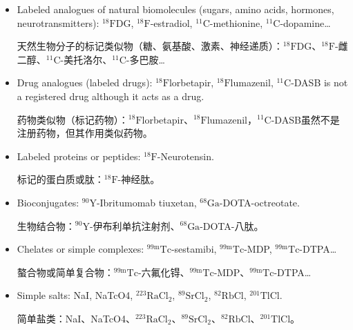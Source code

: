 \documentclass[dvipsnames, svgnames,a4paper,11pt]{article}
\begin{document}
\begin{itemize}

      \item Labeled analogues of natural biomolecules (sugars, amino acids, hormones, neurotransmitters): ${}^\text{18}\text{F}$DG, ${}^\text{18}\text{F}$-estradiol, ${}^\text{11}\text{C}$-methionine, ${}^\text{11}\text{C}$-dopamine…

            天然生物分子的标记类似物（糖、氨基酸、激素、神经递质）：${}^\text{18}\text{F}$DG、${}^\text{18}\text{F}$-雌二醇、${}^\text{11}\text{C}$-美托洛尔、${}^\text{11}\text{C}$-多巴胺…

      \item Drug analogues (labeled drugs): ${}^\text{18}\text{F}$lorbetapir, ${}^\text{18}\text{F}$lumazenil, ${}^\text{11}\text{C}$-DASB is not a registered drug although it acts as a drug.

            药物类似物（标记药物）：${}^\text{18}\text{F}$lorbetapir、${}^\text{18}\text{F}$lumazenil，${}^\text{11}\text{C}$-DASB虽然不是注册药物，但其作用类似药物。

      \item Labeled proteins or peptides: ${}^\text{18}\text{F}$-Neurotensin.

            标记的蛋白质或肽：${}^\text{18}\text{F}$-神经肽。

      \item Bioconjugates: ${}^\text{90}\text{Y}$-Ibritumomab tiuxetan, ${}^\text{68}\text{Ga}$-DOTA-octreotate.

            生物结合物：${}^\text{90}\text{Y}$-伊布利单抗注射剂、${}^\text{68}\text{Ga}$-DOTA-八肽。

      \item Chelates or simple complexes: ${}^\text{99m}\text{Tc}$-sestamibi, ${}^\text{99m}\text{Tc}$-MDP, ${}^\text{99m}\text{Tc}$-DTPA…

            螯合物或简单复合物：${}^\text{99m}\text{Tc}$-六氟化锝、${}^\text{99m}\text{Tc}$-MDP、${}^\text{99m}\text{Tc}$-DTPA…

      \item Simple salts: NaI, NaTcO4, ${}^\text{223}\text{RaCl}_2$, ${}^\text{89}\text{SrCl}_2$, ${}^\text{82}\text{RbCl}$, ${}^\text{201}\text{TlCl}$.

            简单盐类：NaI、NaTcO4、${}^\text{223}\text{RaCl}_2$、${}^\text{89}\text{SrCl}_2$、${}^\text{82}\text{RbCl}$、${}^\text{201}\text{TlCl}$。

\end{itemize}
\end{document}
